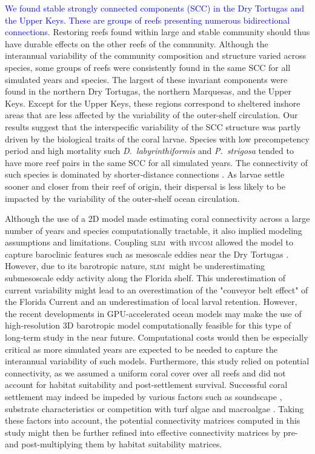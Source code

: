 \documentclass[preprint,12pt,authoryear]{elsarticle}
\newcommand{\modif}[1]{\textcolor{blue}{#1}}
\newcommand{\hycom}{\textsc{hycom} }
\newcommand{\slim}{\textsc{slim}\ }
\begin{document}
	\modif{We found stable strongly connected components (SCC) in the Dry Tortugas and the Upper Keys. These are groups of reefs presenting numerous bidirectional connections.} Restoring reefs found within large and stable community should thus have durable effects on the other reefs of the community. Although the interannual variability of the community composition and structure varied across species, some groups of reefs were consistently found in the same SCC for all simulated years and species. The largest of these invariant components were found in the northern Dry Tortugas, the northern Marquesas, and the Upper Keys. Except for the Upper Keys, these regions correspond to sheltered inshore areas that are less affected by the variability of the outer-shelf circulation. Our results suggest that the interspecific variability of the SCC structure was partly driven by the biological traits of the coral larvae. Species with low precompetency period and high mortality such \textit{D.~labyrinthiformis} and \textit{P.~strigosa} tended to have more reef pairs in the same SCC for all simulated years. The connectivity of such species is dominated by shorter-distance connections \citep{figueiredo2022global}. As larvae settle sooner and closer from their reef of origin, their dispersal is less likely to be impacted by the variability of the outer-shelf ocean circulation.
	
	
	Although the use of a 2D model made estimating coral connectivity across a large number of years and species computationally tractable, it also implied modeling assumptions and limitations. Coupling \slim with \hycom allowed the model to capture baroclinic features such as mesoscale eddies near the Dry Tortugas \citep{dobbelaere2022connecting}. However, due to its barotropic nature, \slim might be underestimating submesoscale eddy activity along the Florida shelf. This underestimation of current variability might lead to an overestimation of the "conveyor belt effect" of the Florida Current \citep{frys2020fine} and an underestimation of local larval retention. However, the recent developments in GPU-accelerated ocean models may make the use of high-resolution 3D barotropic model computationally feasible for this type of long-term study in the near future. Computational costs would then be especially critical as more simulated years are expected to be needed to capture the interannual variability of such models. Furthermore, this study relied on potential connectivity, as we assumed a uniform coral cover over all reefs and did not account for habitat suitability and post-settlement survival. Successful coral settlement may indeed be impeded by various factors such as soundscape \cite{lillis2016variation}, substrate characteristics \citep{jorissen2021coral} or competition with turf algae and macroalgae \cite{webster2015macroalgae}. Taking these factors into account, the potential connectivity matrices computed in this study might then be further refined into effective connectivity matrices by pre- and post-multiplying them by habitat suitability matrices.
	
\end{document}

